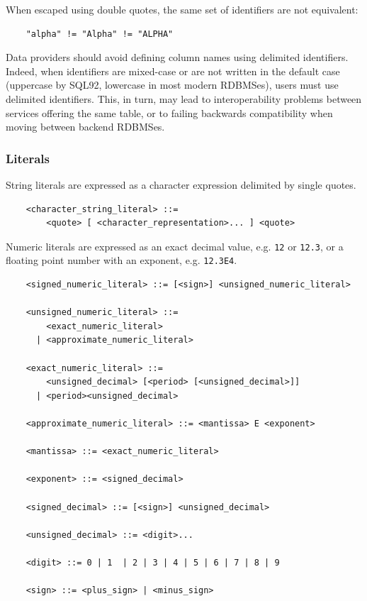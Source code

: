 \documentclass[11pt,a4paper]{ivoa}
\begin{document}
When escaped using double quotes, the same set of identifiers are not equivalent:
\begin{verbatim}
    "alpha" != "Alpha" != "ALPHA"
\end{verbatim}

Data providers should avoid defining column names using delimited identifiers.
Indeed, when identifiers are mixed-case or are not written in the default case
(uppercase by SQL92, lowercase in most modern RDBMSes), users must use delimited
identifiers. This, in turn, may lead to interoperability problems between
services offering the same table, or to failing backwards compatibility when
moving between backend RDBMSes.

\subsubsection{Literals}
\label{sec:literals}

String literals are expressed as a character expression delimited by single quotes.

\begin{verbatim}
    <character_string_literal> ::=
        <quote> [ <character_representation>... ] <quote>
\end{verbatim}

Numeric literals are expressed as an exact decimal value, e.g. \verb:12: or
\verb:12.3:, or a floating point number with an exponent, e.g. \verb:12.3E4:.

\begin{verbatim}
    <signed_numeric_literal> ::= [<sign>] <unsigned_numeric_literal>

    <unsigned_numeric_literal> ::= 
        <exact_numeric_literal>
      | <approximate_numeric_literal>
              
    <exact_numeric_literal> ::=
        <unsigned_decimal> [<period> [<unsigned_decimal>]]
      | <period><unsigned_decimal>

    <approximate_numeric_literal> ::= <mantissa> E <exponent>

    <mantissa> ::= <exact_numeric_literal>

    <exponent> ::= <signed_decimal>

    <signed_decimal> ::= [<sign>] <unsigned_decimal>

    <unsigned_decimal> ::= <digit>...

    <digit> ::= 0 | 1  | 2 | 3 | 4 | 5 | 6 | 7 | 8 | 9
    
    <sign> ::= <plus_sign> | <minus_sign>
\end{verbatim}
\end{document}
